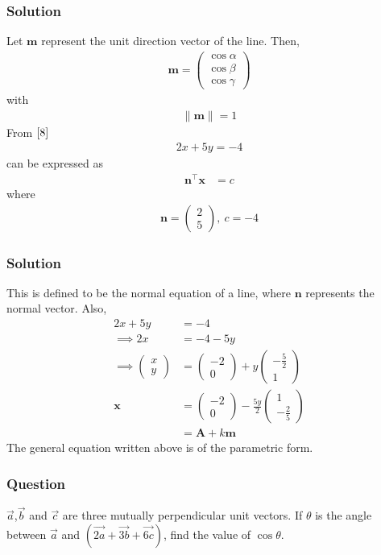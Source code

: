 \documentclass{beamer}
\providecommand{\brak}[1]{\ensuremath{\left(#1\right)}}
\theoremstyle{remark}
\providecommand{\norm}[1]{\lVert#1\rVert}
\newcommand{\myvec}[1]{\ensuremath{\begin{pmatrix}#1\end{pmatrix}}}
\let\vec\mathbf
\begin{document}
%
\begin{frame}
\frametitle{Solution}
Let $\vec{m}$ represent the unit direction vector of the line.  Then,
\begin{align}
    \vec{m} = \myvec{
        \cos{\alpha} \\
        \cos{\beta}\\
        \cos{\gamma}
    }
\end{align}
with 
\begin{align}
	\norm{\vec{m}} =  1
\end{align}
From $\eqref{8}$
\begin{align}
    2x + 5y = -4
    \end{align}
    can be expressed as
\begin{align}
    \vec{n}^{\top}\vec{x} &= c
\end{align}
where
\begin{align}
	\vec{n} = \myvec{2\\5},\ c = -4
\end{align}
\end{frame}
%
\begin{frame}
\frametitle{Solution}
This is defined to be the normal equation of a line, where $\vec{n}$ represents the normal vector.
Also, 
\begin{align}
    2x + 5y &= -4\\
    \implies 2x &= -4 -5y
    \\
    \implies
    \myvec{
        x\\
        y
    } &= \myvec{
        -2\\
        0
    } + y\myvec{
        -\frac{5}{2}\\
        1
    }\\
    \vec{x} &= \myvec{
        -2\\
        0
    } -\frac{5y}{2}\myvec{
        1\\
        -\frac{2}{5}
    }\\
    &= \vec{A} + k\vec{m} \label{11}
\end{align}
The general equation written above is of the parametric form.
\end{frame}
%
\begin{frame}
\frametitle{Question }
$\overrightarrow{a}$,$\overrightarrow{b}$ and $\overrightarrow{c}$ are three mutually perpendicular unit vectors. If $\theta$ is the angle between $\overrightarrow{a}$ and $\brak{\overrightarrow{2a}+\overrightarrow{3b}+\overrightarrow{6c}}$, find the value of $\cos{\theta}$. 
\end{frame}
\end{document}
